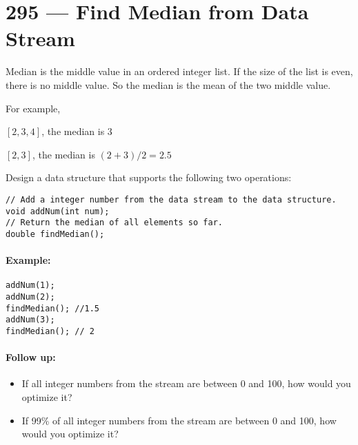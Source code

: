 \section{295 --- Find Median from Data Stream}
Median is the middle value in an ordered integer list. If the size of the list is even, there is no middle value. So the median is the mean of the two middle value.
\par
For example,
\par
$[2,3,4]$, the median is 3
\par
$[2,3]$, the median is $(2 + 3) / 2 = 2.5$
\par
Design a data structure that supports the following two operations:

\begin{lstlisting}[style=customc]
// Add a integer number from the data stream to the data structure.
void addNum(int num);
// Return the median of all elements so far. 
double findMedian(); 
\end{lstlisting}
 

\paragraph{Example:}

\begin{flushleft}
\begin{lstlisting}[style=customc]
addNum(1);
addNum(2);
findMedian(); //1.5
addNum(3); 
findMedian(); // 2
\end{lstlisting}
\end{flushleft}

\paragraph{Follow up:}

\begin{itemize}
\item If all integer numbers from the stream are between 0 and 100, how would you optimize it?
\item If 99\% of all integer numbers from the stream are between 0 and 100, how would you optimize it?
\end{itemize}